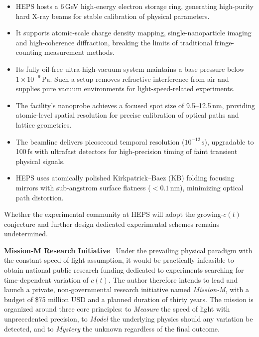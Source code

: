 \documentclass[12pt,leqno]{article}
\begin{document}
{	\begin{itemize}
		\item HEPS hosts a 6\,GeV high-energy electron storage ring, generating high-purity hard X-ray beams for stable calibration of physical parameters.
		
		\item It supports atomic-scale charge density mapping, single-nanoparticle imaging and high-coherence diffraction, breaking the limits of traditional fringe-counting measurement methods.
		
		\item Its fully oil-free ultra-high-vacuum system maintains a base pressure below $1\times10^{-9}\,\mathrm{Pa}$. Such a setup removes refractive interference from air and supplies pure vacuum environments for light-speed-related experiments.
		
		\item The facility’s nanoprobe achieves a focused spot size of 9.5–12.5\,nm, providing atomic-level spatial resolution for precise calibration of optical paths and lattice geometries.
		
		\item The beamline delivers picosecond temporal resolution ($10^{-12}\,\mathrm{s}$), upgradable to 100\,fs with ultrafast detectors for high-precision timing of faint transient physical signals.
		
		\item HEPS uses atomically polished Kirkpatrick–Baez (KB) folding focusing mirrors with sub-angstrom surface flatness ($<0.1\,\mathrm{nm}$), minimizing optical path distortion.
	\end{itemize}
	
	\medskip
	Whether the experimental community at HEPS will adopt the growing-$c(t)$ conjecture and further design dedicated experimental schemes remains undetermined.
	
	
	\medskip
	\bigskip
	\textbf{Mission-M Research Initiative}\,\,\,
	Under the prevailing physical paradigm with the constant speed-of-light assumption, it would be practically infeasible to obtain national public research funding dedicated to experiments searching for time-dependent variation of \(c(t)\). The author therefore intends to lead and launch a private, non‑governmental research initiative named \textit{Mission‑M}, with a budget of \$75 million USD and a planned duration of thirty years. The mission is organized around three core principles: to \textit{Measure} the speed of light with unprecedented precision, to \textit{Model} the underlying physics should any variation be detected, and to \textit{Mystery} the unknown regardless of the final outcome.
	
}
\end{document}
